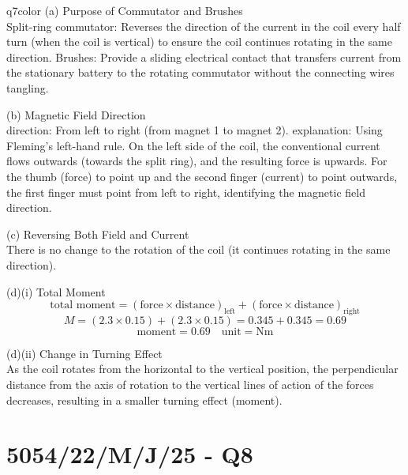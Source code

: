 \documentclass[11pt,a4paper]{article}
\newcommand{\qsection}[1]{\needspace{10\baselineskip}\section*{#1}}
\begin{document}
\begin{ansbox}{q7color}
(a) Purpose of Commutator and Brushes\\[4pt]
Split-ring commutator: Reverses the direction of the current in the coil every half turn (when the coil is vertical) to ensure the coil continues rotating in the same direction.
Brushes: Provide a sliding electrical contact that transfers current from the stationary battery to the rotating commutator without the connecting wires tangling.

\vspace{4pt}
(b) Magnetic Field Direction\\[4pt]
direction: From left to right (from magnet 1 to magnet 2).
explanation: Using Fleming's left-hand rule. On the left side of the coil, the conventional current flows outwards (towards the split ring), and the resulting force is upwards. For the thumb (force) to point up and the second finger (current) to point outwards, the first finger must point from left to right, identifying the magnetic field direction.

\vspace{4pt}
(c) Reversing Both Field and Current\\[4pt]
There is no change to the rotation of the coil (it continues rotating in the same direction).
\clearpage

(d)(i) Total Moment\\[4pt]
\[ \text{total moment} = (\text{force} \times \text{distance})_{\text{left}} + (\text{force} \times \text{distance})_{\text{right}} \]
\[ M = (2.3 \times 0.15) + (2.3 \times 0.15) = 0.345 + 0.345 = 0.69 \]
\[ \text{moment} = \boxed{0.69} \quad \text{unit} = \boxed{\text{Nm}} \]

\vspace{4pt}
(d)(ii) Change in Turning Effect\\[4pt]
As the coil rotates from the horizontal to the vertical position, the perpendicular distance from the axis of rotation to the vertical lines of action of the forces decreases, resulting in a smaller turning effect (moment).
\end{ansbox}
\vspace{-2.5cm}
\qsection{5054/22/M/J/25 - Q8}\label{p2_mj25:q8}
\end{document}
